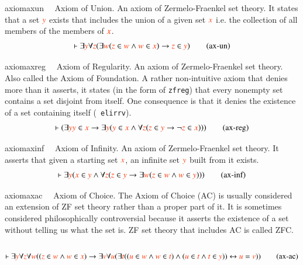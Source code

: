 \begin{restatable}{axiom}{axun}~~ Axiom of Union.  An axiom of Zermelo-Fraenkel
set theory.  It states
       that a set $\msc{y}$ exists that includes the union of a given set
$\msc{x}$
       i.e. the collection of all members of the members of $\msc{x}$.       ~
\begin{align}
\vdash \exists \msc{y} \forall \msc{z} ( \exists \msc{w} ( \msc{z} \in \msc{w}
    \wedge \msc{w} \in \msc{x} ) \rightarrow \msc{z} \in \msc{y}
    )\label{eq:ax-un}\tag{ax-un}
\end{align}
\end{restatable}

\begin{restatable}{axiom}{axreg}~~ Axiom of Regularity.  An axiom of
Zermelo-Fraenkel set theory.  Also
       called the Axiom of Foundation.  A rather non-intuitive axiom that
       denies more than it asserts, it states (in the form of {\tt zfreg})
that
       every nonempty set contains a set disjoint from itself.  One
consequence
       is that it denies the existence of a set containing itself ({\tt
elirrv}). ~
\begin{align}
\vdash ( \exists \msc{y} \msc{y} \in \msc{x} \rightarrow \exists \msc{y} (
    \msc{y} \in \msc{x} \wedge \forall \msc{z} ( \msc{z} \in \msc{y}
    \rightarrow \lnot \msc{z} \in \msc{x} ) ) )\label{eq:ax-reg}\tag{ax-reg}
\end{align}
\end{restatable}

\begin{restatable}{axiom}{axinf}~~ Axiom of Infinity.  An axiom of
Zermelo-Fraenkel set theory.  
       It asserts that given a starting set $\msc{x}$, an infinite set
$\msc{y}$ built
       from it exists.  
\begin{align}
\vdash \exists \msc{y} ( \msc{x} \in \msc{y} \wedge \forall \msc{z} ( \msc{z}
    \in \msc{y} \rightarrow \exists \msc{w} ( \msc{z} \in \msc{w} \wedge
    \msc{w} \in \msc{y} ) ) )\label{eq:ax-inf}\tag{ax-inf}
\end{align}
\end{restatable}

\begin{restatable}{axiom}{axac}~~ Axiom of Choice.  The Axiom of Choice (AC) is
usually considered an
       extension of ZF set theory rather than a proper part of it.  It is
       sometimes considered philosophically controversial because it asserts
       the existence of a set without telling us what the set is.  ZF set
       theory that includes AC is called ZFC.
  ~
\begin{align}
\vdash \exists \msc{y} \forall \msc{z} \forall \msc{w} ( ( \msc{z} \in \msc{w}
    \wedge \msc{w} \in \msc{x} ) \rightarrow \exists \msc{v} \forall \msc{u} (
    \exists \msc{t} ( ( \msc{u} \in \msc{w} \wedge \msc{w} \in \msc{t} ) \wedge
    ( \msc{u} \in \msc{t} \wedge \msc{t} \in \msc{y} ) ) \leftrightarrow
    \msc{u} = \msc{v} ) )\label{eq:ax-ac}\tag{ax-ac}
\end{align}
\end{restatable}

